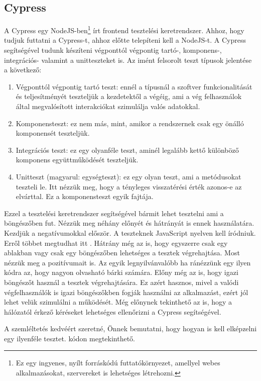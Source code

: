 \documentclass[]{thesis-ekf}
\theoremstyle{definition}
\theoremstyle{remark}
\begin{document}
	\subsection{Cypress}
		A Cypress egy NodeJS-ben\footnote{Ez egy ingyenes, nyílt forráskódú futtatókörnyezet, amellyel webes alkalmazásokat, szervereket is lehetséges létrehozni.} írt frontend tesztelési keretrendszer. Ahhoz, hogy tudjuk futtatni a Cypress-t, ahhoz előtte telepíteni kell a NodeJS-t. A Cypress segítségével tudunk készíteni végponttól végpontig tartó-, komponens-, integrációs- valamint a unitteszteket is.
		Az imént felsorolt teszt típusok jelentése a következő:
		\begin{enumerate}
			\item Végponttól végpontig tartó teszt: ennél a típusnál a szoftver funkcionalitását és teljesítményét teszteljük a kezdetektől a végéig, ami a vég felhasználok által megvalósított interakciókat szimulálja valós adatokkal.
			\item Komponensteszt: ez nem más, mint, amikor a rendszernek csak egy önálló komponensét teszteljük.
			\item Integrációs teszt: ez egy olyanféle teszt, aminél legalább kettő különböző komponens együttműködését teszteljük.
			\item Unitteszt (magyarul: egységteszt): ez egy olyan teszt, ami a metódusokat teszteli le. Itt nézzük meg, hogy a tényleges visszatérési érték azonos-e az elvárttal. Ez a komponensteszt egyik fajtája.
		\end{enumerate}
		Ezzel a tesztelési keretrendszer segítségével bármit lehet tesztelni ami a böngészőben fut. Nézzük meg néhány előnyét és hátrányát is ennek használatára. Kezdjük a negatívumokkal először. A teszteknek JavaScript nyelven kell íródniuk. Erről többet megtudhat itt . Hátrány még az is, hogy egyszerre csak egy ablakban vagy csak egy böngészőben lehetséges a tesztek végrehajtása. Most nézzük meg a pozitívumait is. Az egyik legnyilvánvalóbb ha ránézzünk egy ilyen kódra az, hogy nagyon olvasható bárki számára. Előny még az is, hogy igazi böngészőt használ a tesztek végrehajtására. Ez azért hasznos, mivel a valódi végfelhasználók is igazi böngészőkben fogják használni az alkalmazást, ezért jól lehet velük szimulálni a működését. Még előnynek tekinthető az is, hogy a hálózatól érkező kéréseket lehetséges ellenőrizni a Cypress segítségével.
		\cite{Cypress, Kusper Szoftvertesztles, Katalon, Medium, NodeJS}
		
		A szemléltetés kedvéért szeretné, Önnek bemutatni, hogy hogyan is kell elképzelni egy ilyenféle tesztet.  kódon megtekinthető.
		
\end{document}
